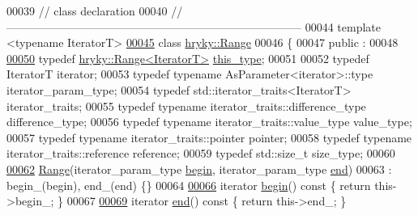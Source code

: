\begin{DoxyCode}
00039 \textcolor{comment}{// class declaration}
00040 \textcolor{comment}{//
      ------------------------------------------------------------------------------}
00044 \textcolor{comment}{}\textcolor{keyword}{template} <\textcolor{keyword}{typename} IteratorT>
\hypertarget{range_8h_source_l00045}{}\hyperlink{classhryky_1_1_range}{00045} \textcolor{keyword}{class }\hyperlink{classhryky_1_1_range}{hryky::Range}
00046 \{
00047 \textcolor{keyword}{public} :
00048 
\hypertarget{range_8h_source_l00050}{}\hyperlink{classhryky_1_1_range_a19d3a6ea685d44106936a6304fe44ec1}{00050}     \textcolor{keyword}{typedef} \hyperlink{classhryky_1_1_range}{hryky::Range<IteratorT>} \hyperlink{classhryky_1_1_range_a19d3a6ea685d44106936a6304fe44ec1}{this_type};
00051 
00052     \textcolor{keyword}{typedef} IteratorT                                   iterator;
00053     \textcolor{keyword}{typedef} \textcolor{keyword}{typename} AsParameter<iterator>::type        iterator\_param\_type;
00054     \textcolor{keyword}{typedef} std::iterator\_traits<IteratorT>             iterator\_traits;
00055     \textcolor{keyword}{typedef} \textcolor{keyword}{typename} iterator\_traits::difference\_type   difference\_type;
00056     \textcolor{keyword}{typedef} \textcolor{keyword}{typename} iterator\_traits::value\_type        value\_type;
00057     \textcolor{keyword}{typedef} \textcolor{keyword}{typename} iterator\_traits::pointer           pointer;
00058     \textcolor{keyword}{typedef} \textcolor{keyword}{typename} iterator\_traits::reference         reference;
00059     \textcolor{keyword}{typedef} std::size\_t                                 size\_type;
00060 
\hypertarget{range_8h_source_l00062}{}\hyperlink{classhryky_1_1_range_ae63ff553300d8c509419fcbae9b6f95d}{00062}     \hyperlink{classhryky_1_1_range_ae63ff553300d8c509419fcbae9b6f95d}{Range}(iterator\_param\_type \hyperlink{classhryky_1_1_range_aaa45d0481e79fb4d22ec8f048fa23086}{begin}, iterator\_param\_type \hyperlink{classhryky_1_1_range_a202ec210efd7e9cb9a22b2e98ab21107}{end})
00063         : begin\_(begin), end\_(end) \{\}
00064 
\hypertarget{range_8h_source_l00066}{}\hyperlink{classhryky_1_1_range_aaa45d0481e79fb4d22ec8f048fa23086}{00066}     iterator \hyperlink{classhryky_1_1_range_aaa45d0481e79fb4d22ec8f048fa23086}{begin}()\textcolor{keyword}{ const }\{ \textcolor{keywordflow}{return} this->begin\_; \}
00067 
\hypertarget{range_8h_source_l00069}{}\hyperlink{classhryky_1_1_range_a202ec210efd7e9cb9a22b2e98ab21107}{00069}     iterator \hyperlink{classhryky_1_1_range_a202ec210efd7e9cb9a22b2e98ab21107}{end}()\textcolor{keyword}{ const }\{ \textcolor{keywordflow}{return} this->end\_; \}

\end{DoxyCode}
